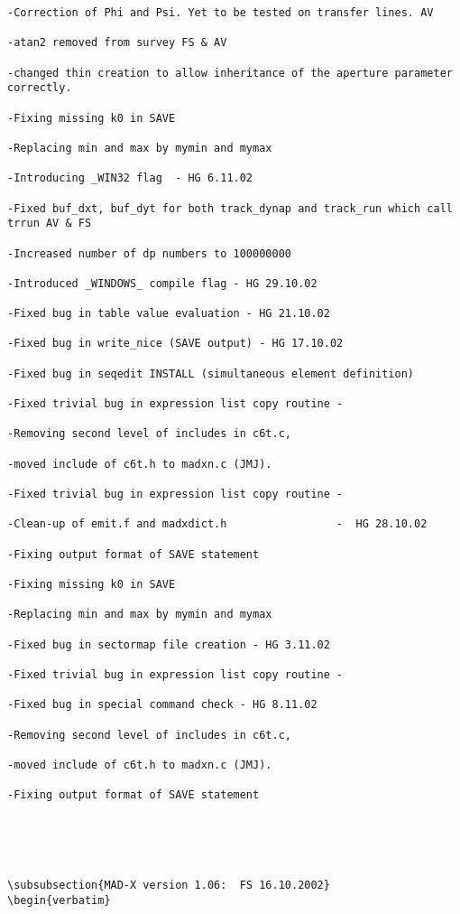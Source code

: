 \begin{verbatim}
-Correction of Phi and Psi. Yet to be tested on transfer lines. AV

-atan2 removed from survey FS & AV

-changed thin creation to allow inheritance of the aperture parameter correctly.

-Fixing missing k0 in SAVE

-Replacing min and max by mymin and mymax

-Introducing _WIN32 flag  - HG 6.11.02

-Fixed buf_dxt, buf_dyt for both track_dynap and track_run which call trrun AV & FS

-Increased number of dp numbers to 100000000

-Introduced _WINDOWS_ compile flag - HG 29.10.02

-Fixed bug in table value evaluation - HG 21.10.02

-Fixed bug in write_nice (SAVE output) - HG 17.10.02

-Fixed bug in seqedit INSTALL (simultaneous element definition)

-Fixed trivial bug in expression list copy routine -

-Removing second level of includes in c6t.c,

-moved include of c6t.h to madxn.c (JMJ).

-Fixed trivial bug in expression list copy routine -

-Clean-up of emit.f and madxdict.h                 -  HG 28.10.02

-Fixing output format of SAVE statement

-Fixing missing k0 in SAVE

-Replacing min and max by mymin and mymax

-Fixed bug in sectormap file creation - HG 3.11.02

-Fixed trivial bug in expression list copy routine -

-Fixed bug in special command check - HG 8.11.02

-Removing second level of includes in c6t.c,

-moved include of c6t.h to madxn.c (JMJ).

-Fixing output format of SAVE statement





\subsubsection{MAD-X version 1.06:  FS 16.10.2002}
\begin{verbatim}


\end{verbatim}
